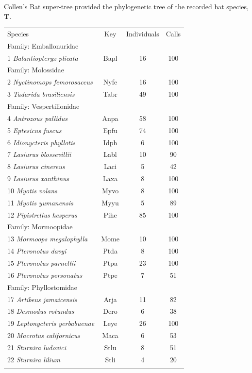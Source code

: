 \documentclass{ws-rv9x6}
\begin{document}
Collen's \cite{collen2012evolution} Bat super-tree provided the phylogenetic tree of the recorded bat species, \(\mathbf{T}\). 

\begin{table}[ht]
	{\begin{tabular}{@{}lccc@{}} \toprule
			Species & Key & Individuals & Calls \\ \colrule
			Family: Emballonuridae &&& \\
			1 \textit{Balantiopteryx plicata} & Bapl & 16 & 100 \\
			\colrule
			Family: Molossidae &&& \\
			2 \textit{Nyctinomops femorosaccus} & Nyfe & 16 & 100 \\
			3 \textit{Tadarida brasiliensis} & Tabr & 49 & 100  \\
			\colrule
			Family: Vespertilionidae &&& \\
			4 \textit{Antrozous pallidus} & Anpa & 58 & 100 \\
			5 \textit{Eptesicus fuscus} & Epfu & 74 & 100 \\
			6 \textit{Idionycteris phyllotis} & Idph & 6 & 100 \\
			7 \textit{Lasiurus blossevillii} & Labl & 10 & 90 \\
			8 \textit{Lasiurus cinereus} & Laci & 5 & 42 \\
			9 \textit{Lasiurus xanthinus} & Laxa & 8 & 100 \\
			10 \textit{Myotis volans} & Myvo & 8 & 100 \\
			11 \textit{Myotis yumanensis} & Myyu & 5 & 89 \\
			12 \textit{Pipistrellus hesperus} & Pihe & 85 & 100 \\
			\colrule
			Family: Mormoopidae &&& \\
			13 \textit{Mormoops megalophylla} & Mome & 10 & 100 \\
			14 \textit{Pteronotus davyi} & Ptda & 8 & 100 \\
			15 \textit{Pteronotus parnellii} & Ptpa & 23 & 100 \\
			16 \textit{Pteronotus personatus} & Ptpe & 7 & 51 \\
			\colrule
			Family: Phyllostomidae &&& \\
			17 \textit{Artibeus jamaicensis} & Arja & 11 & 82 \\
			18 \textit{Desmodus rotundus} & Dero & 6 & 38 \\
			19 \textit{Leptonycteris yerbabuenae} & Leye & 26 & 100 \\
			20 \textit{Macrotus californicus} & Maca & 6 & 53 \\
			21 \textit{Sturnira ludovici} & Stlu & 8 & 51 \\
			22 \textit{Sturnira lilium} & Stli & 4 & 20 \\
			\botrule
		\end{tabular}
	}
	\label{tab::dataset}
\end{table}
\end{document}
